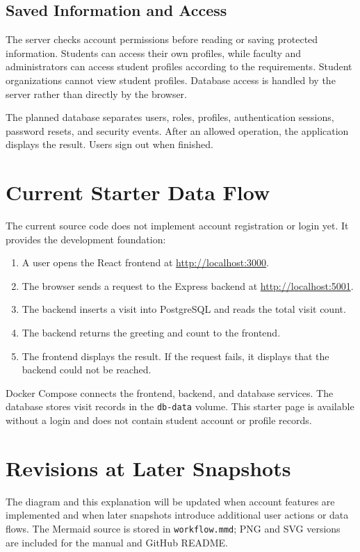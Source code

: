\subsection{Saved Information and Access}
The server checks account permissions before reading or saving protected information. Students can access their own profiles, while faculty and administrators can access student profiles according to the requirements. Student organizations cannot view student profiles. Database access is handled by the server rather than directly by the browser.

The planned database separates users, roles, profiles, authentication sessions, password resets, and security events. After an allowed operation, the application displays the result. Users sign out when finished.

\newpage %
\section{Current Starter Data Flow}
The current source code does not implement account registration or login yet. It provides the development foundation:
\begin{enumerate}[label=\arabic*.]
\item A user opens the React frontend at \url{http://localhost:3000}.
\item The browser sends a request to the Express backend at \url{http://localhost:5001}.
\item The backend inserts a visit into PostgreSQL and reads the total visit count.
\item The backend returns the greeting and count to the frontend.
\item The frontend displays the result. If the request fails, it displays that the backend could not be reached.
\end{enumerate}
Docker Compose connects the frontend, backend, and database services. The database stores visit records in the \texttt{db-data} volume. This starter page is available without a login and does not contain student account or profile records.

\newpage %
\section{Revisions at Later Snapshots}
The diagram and this explanation will be updated when account features are implemented and when later snapshots introduce additional user actions or data flows. The Mermaid source is stored in \texttt{workflow.mmd}; PNG and SVG versions are included for the manual and GitHub README.




